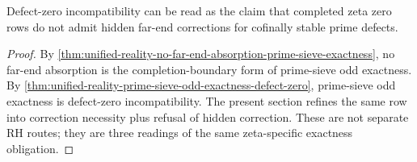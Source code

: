 \begin{corollary}
\label{cor:unified-reality-defect-zero-incompatibility-correction-refusal}
Defect-zero incompatibility can be read as the claim that completed zeta
zero rows do not admit hidden far-end corrections for cofinally stable
prime defects.
\end{corollary}

\begin{proof}
By
\autoref{thm:unified-reality-no-far-end-absorption-prime-sieve-exactness},
no far-end absorption is the completion-boundary form of prime-sieve odd
exactness.  By
\autoref{thm:unified-reality-prime-sieve-odd-exactness-defect-zero},
prime-sieve odd exactness is defect-zero incompatibility.  The present
section refines the same row into correction necessity plus refusal of
hidden correction.  These are not separate RH routes; they are three
readings of the same zeta-specific exactness obligation.
\end{proof}
